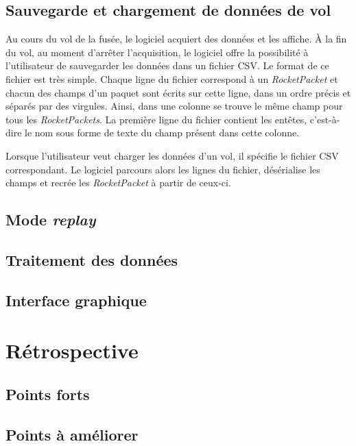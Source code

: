 \subsection{Sauvegarde et chargement de données de vol}
Au cours du vol de la fusée, le logiciel acquiert des données et les affiche.
À la fin du vol, au moment d'arrêter l'acquisition, le logiciel offre la possibilité à l'utilisateur de sauvegarder les données dans un fichier CSV.
Le format de ce fichier est très simple.
Chaque ligne du fichier correspond à un \emph{RocketPacket} et chacun des champs d'un paquet sont écrits sur cette ligne, dans un ordre précis et séparés par des virgules.
Ainsi, dans une colonne se trouve le même champ pour tous les \emph{RocketPackets}.
La première ligne du fichier contient les entêtes, c'est-à-dire le nom sous forme de texte du champ présent dans cette colonne.

Lorsque l'utilisateur veut charger les données d'un vol, il spécifie le fichier CSV correspondant.
Le logiciel parcours alors les lignes du fichier, désérialise les champs et recrée les \emph{RocketPacket} à partir de ceux-ci.

\subsection{Mode \textit{replay}}
\label{s:mode_replay}


\subsection{Traitement des données}
\label{s:traitement}


\subsection{Interface graphique}


\section{Rétrospective}

\subsection{Points forts}


\subsection{Points à améliorer}
